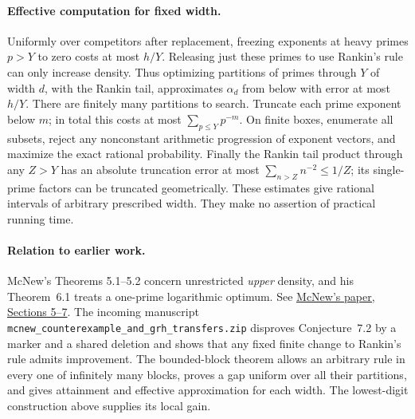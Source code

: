 \paragraph{Effective computation for fixed width.}
Uniformly over competitors after replacement, freezing exponents at
heavy primes $p>Y$ to zero costs at most $h/Y$. Releasing just
these primes to use Rankin's rule can only increase density. Thus
optimizing partitions of primes through $Y$ of width $d$, with the
Rankin tail, approximates $\alpha_d$ from below with error at most
$h/Y$. There are finitely many partitions to search. Truncate each
prime exponent below $m$; in total this costs at most
$\sum_{p\le Y}p^{-m}$. On finite boxes, enumerate all subsets,
reject any nonconstant arithmetic progression of exponent vectors,
and maximize the exact rational probability. Finally the Rankin
tail product through any $Z>Y$ has an absolute truncation error at most
$\sum_{n>Z}n^{-2}\le1/Z$; its single-prime factors can be truncated
geometrically. These estimates give rational intervals of arbitrary
prescribed width. They make no assertion of practical running time.

\paragraph{Relation to earlier work.}
McNew's Theorems 5.1--5.2 concern unrestricted \emph{upper} density,
and his Theorem~6.1 treats a one-prime logarithmic optimum.
See \href{https://www.nathanmcnew.com/GPFsets.pdf}{McNew's paper,
Sections 5--7}. The incoming manuscript
\texttt{mcnew\_counterexample\_and\_grh\_transfers.zip} disproves
Conjecture~7.2 by a marker and a shared deletion and shows that any
fixed finite change to Rankin's rule admits improvement. The bounded-block
theorem allows an arbitrary rule in every one of infinitely many
blocks, proves a gap uniform over all their partitions, and gives
attainment and effective approximation for each width. The lowest-digit
construction above supplies its local gain.
